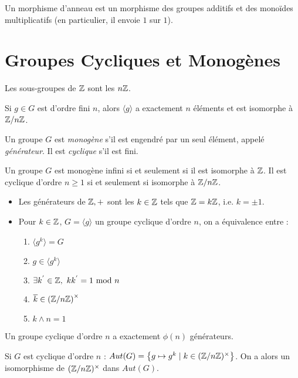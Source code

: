 \documentclass{cours}
\newcommand*{\scalar}[1]{\langle #1 \rangle}
\begin{document}
\begin{definition}
    Un morphisme d'anneau est un morphisme des groupes additifs et des monoïdes multiplicatifs (en particulier, il envoie $1$ sur $1$).
\end{definition}

\section{Groupes Cycliques et Monogènes}
\begin{proposition}
    Les sous-groupes de $\mathbb{Z}$ sont les $n\mathbb{Z}$.
\end{proposition}

\begin{proposition}
    Si $g \in G$ est d'ordre fini $n$, alors $\langle g \rangle$ a exactement $n$ éléments et est isomorphe à $\mathbb{Z}/n\mathbb{Z}$. 
\end{proposition}

\begin{definition}
    Un groupe $G$ est \emph{monogène} s'il est engendré par un seul élément, appelé \emph{générateur}. Il est \emph{cyclique} s'il est fini. 
\end{definition}

\begin{corollary}
    Un groupe $G$ est monogène infini si et seulement si il est isomorphe à $\mathbb{Z}$. Il est cyclique d'ordre $n \geq 1$ si et seulement si isomorphe à $\mathbb{Z}/n\mathbb{Z}$.
\end{corollary}

\begin{proposition}
    \begin{itemize}
        \item Les générateurs de $\mathbb{Z}, +$ sont les $k \in \mathbb{Z}$ tels que $\mathbb{Z} = k\mathbb{Z}$, i.e. $k = \pm 1$.
        \item Pour $k \in \mathbb{Z}$, $G = \scalar{g}$ un groupe cyclique d'ordre $n$, on a équivalence entre :
        \begin{enumerate}
            \item $\scalar{g^{k}} = G$
            \item $g \in \scalar{g^{k}}$
            \item $\exists k^{'} \in \mathbb{Z},\ kk^{'} = 1 \text{ mod } n$
            \item $\overline{k} \in \left(\mathbb{Z}/n\mathbb{Z}\right)^{\times}$
            \item $k \wedge n = 1$
        \end{enumerate}
    \end{itemize}
\end{proposition}
\begin{corollary}
    Un groupe cyclique d'ordre $n$ a exactement $\phi(n)$ générateurs.
\end{corollary}
\begin{corollary}
    Si $G$ est cyclique d'ordre $n$ : $Aut(G) = \left\{g \mapsto g^{k} \mid k \in (\mathbb{Z}/n\mathbb{Z})^{\times}\right\}$. On a alors un isomorphisme de $(\mathbb{Z}/n\mathbb{Z})^{\times}$ dans $Aut(G)$.
\end{corollary}
\end{document}
